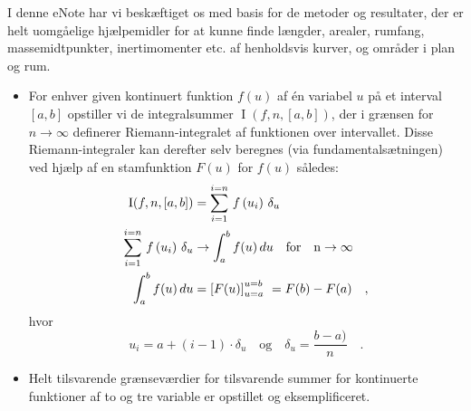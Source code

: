 \begin{summary}
I denne eNote har vi beskæftiget os med basis for de metoder og resultater, der er helt uomgåelige hjælpemidler for at kunne finde
længder, arealer, rumfang, massemidtpunkter, inertimomenter etc. af henholdsvis kurver, og områder i plan og rum.\\
\begin{itemize}

\item For enhver  given kontinuert funktion $f(u)$ af \'{e}n variabel $u$ på et interval $[a, b]$ opstiller vi de integralsummer $\operatorname{I}(f,n, [a, b])$, der i grænsen for $n\to \infty$
definerer  Riemann-integralet af funktionen over intervallet.  Disse Riemann-integraler kan derefter selv beregnes (via fundamentalsætningen)  ved hjælp af en stamfunktion $F(u)$ for $f(u)$ således:
\begin{equation}
\begin{aligned}
\operatorname{I}(f,n, [a, b]) &=  \sum_{i=1}^{i=n}\, f\left(u_{i}\right)\,\delta_{u} \\
 \sum_{i=1}^{i=n}\, f\left(u_{i}\right)\,\delta_{u}  &\to \int_{a}^{b} f(u)\, du \quad \rm{for}\quad  n \to \infty \\
\int_{a}^{b} f(u)\, du  &= \left[F(u)\right]_{u=a}^{u=b} \, \,  = F(b) - F(a) \quad ,
\end{aligned}
\end{equation}
hvor
\begin{equation}
u_{i}= a + (i-1)\cdot \delta_{u} \quad \textrm{og} \quad \delta_{u} = \frac{b-a)}{n} \quad .
\end{equation}
\item Helt tilsvarende grænseværdier for tilsvarende summer for kontinuerte funktioner af to og tre variable er opstillet og eksemplificeret.
\end{itemize}
\end{summary}






